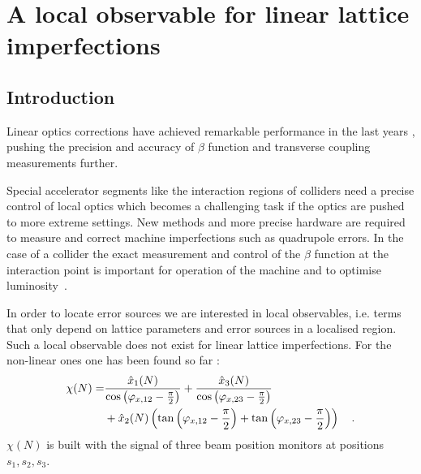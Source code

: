 \chapter{A local observable for linear lattice imperfections}
\label{ch_localobs}

\newcommand{\combtoangle}[3]{
  $\SI{#1}{\degree} - \SI{#2}{\degree} - \SI{#3}{\degree}$
}

\newcommand{\noiserms}{$0.7\times 10^{-3}\times 2\pi$ rad{}}
\newcommand{\highnoise}{$1.8\times 10^{-3}\times 2\pi$ rad{}}

\newcommand{\maxfigwidth}{8.5cm}


\section{Introduction}

Linear optics corrections have achieved remarkable performance in the last years
\cite{Tomas2017, Tomas2012, Persson2017, Aiba2013, Sagan2000, Borer1983, Langner2015},
pushing the precision and accuracy of $\beta$ function and transverse coupling
measurements further.

Special accelerator segments like the interaction regions of colliders
need a precise control of local optics which becomes a challenging task
if the optics are pushed to more extreme settings. New methods and more
precise hardware are required to measure and correct machine
imperfections such as quadrupole errors. In the case of a collider the
exact measurement and control of the $\beta$ function at the interaction point is important for operation of
the machine and to optimise luminosity~\cite{jaime}.


In order to locate error sources we are interested in local
observables, i.e. terms that only depend on lattice parameters and error sources in a localised
region. Such a local observable does not exist for linear lattice imperfections. For the non-linear
ones one has been found so far
\cite{Tomas2005, Franchi2007}: 
%
\begin{align}
  \chi(N) =& \frac{\hat{x}_1(N)}{\cos \left( \varphi_{x,12} - \frac{\pi}{2} \right)} 
  + \frac{\hat{x}_3(N)}{\cos\left( \varphi_{x,23}-\frac{\pi}{2} \right)} \notag \\
  &+ \hat{x}_2 (N) \left(
    \tan\left( \varphi_{x,12}-\frac{\pi}{2} \right)
    + \tan\left( \varphi_{x,23}-\frac{\pi}{2} \right)
  \right)
  \quad .
  \label{eq_chi}
\end{align}
%
$\chi (N)$ is built with the signal of three beam position monitors at positions $s_1, s_2, s_3$.

